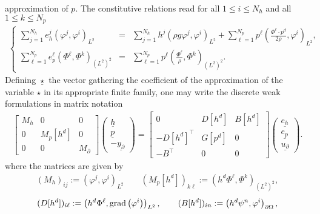 \documentclass[letterpaper,10pt,english]{sphinxmanual}
\begin{document}
approximation of \(p\). The constitutive relations read for all
\(1 \le i \le N_h\) and all \(1 \le k \le N_p\)
\begin{equation*}
\begin{split}\left\lbrace
\begin{array}{rcl}
\sum_{j=1}^{N_h} e_h^j \left( \varphi^j, \varphi^i \right)_{L^2} &=& \sum_{j=1}^{N_h} h^j \left( \rho g \varphi^j, \varphi^i \right)_{L^2} + \sum_{\ell=1}^{N_p} p^\ell \left( \frac{\Phi^\ell \cdot p^d}{2 \rho}, \varphi^i \right)_{L^2}, \\
\sum_{\ell=1}^{N_p} e_p^\ell \left( \Phi^\ell, \Phi^k \right)_{(L^2)^2} &=& \sum_{\ell=1}^{N_p} p^\ell \left( \frac{\Phi^\ell}{\rho}, \Phi^k \right)_{(L^2)^2}.
\end{array}
\right.\end{split}
\end{equation*}
\sphinxAtStartPar
Defining \(\underline{\star}\) the vector gathering the coefficient
of the approximation of the variable \(\star\) in its appropriate
finite family, one may write the discrete weak formulations in matrix
notation
\begin{equation*}
\begin{split}\begin{bmatrix} M_h & 0 & 0 \\ 0 & M_p[h^d] & 0 \\ 0 & 0 & M_\partial \end{bmatrix} \begin{pmatrix} \underline{h} \\ \underline{p} \\ -\underline{y_\partial} \end{pmatrix}
=
\begin{bmatrix}
0 & D[h^d] & B[h^d] \\
-D[h^d]^\top & G[p^d] & 0 \\
- B^\top & 0 & 0
\end{bmatrix}
\begin{pmatrix} \underline{e_h} \\ \underline{e_p} \\ \underline{u_\partial} \end{pmatrix}.\end{split}
\end{equation*}
\sphinxAtStartPar
where the matrices are given by
\begin{equation*}
\begin{split}(M_h)_{ij} := \left( \varphi^j, \varphi^i \right)_{L^2} \qquad (M_p[h^d])_{k\ell} := \left( h^d \Phi^\ell, \Phi^k \right)_{(L^2)^2},\end{split}
\end{equation*}\begin{equation*}
\begin{split}(D[h^d])_{i\ell} := \left( h^d \Phi^\ell, {\rm grad} \left( \varphi^i \right) \right)_{L^2}, \qquad (B[h^d])_{in} := \left( h^d \psi^n, \varphi^i \right)_{\partial\Omega},\end{split}
\end{equation*}
\end{document}
